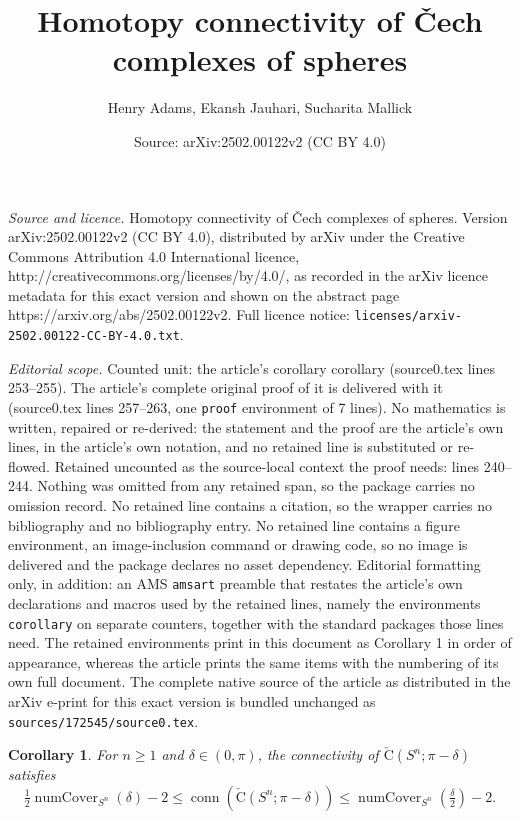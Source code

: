 \documentclass[10pt,a4paper]{amsart}
\title{Homotopy connectivity of \v{C}ech complexes of spheres}
\author{Henry Adams, Ekansh Jauhari, Sucharita Mallick}
\date{Source: arXiv:2502.00122v2 (CC BY 4.0)}
\newtheorem{corollary}{Corollary}
\newcommand{\cech}[2]{\mathrm{\check{C}}(#1;#2)}
\DeclareMathOperator{\conn}{conn}
\DeclareMathOperator{\numcov}{numCover}
\begin{document}
\maketitle

\noindent\emph{Source and licence.} Homotopy connectivity of \v{C}ech complexes of spheres. Version arXiv:2502.00122v2 (CC BY 4.0), distributed by arXiv under the Creative Commons Attribution 4.0 International licence, http://creativecommons.org/licenses/by/4.0/, as recorded in the arXiv licence metadata for this exact version and shown on the abstract page https://arxiv.org/abs/2502.00122v2. Full licence notice: \texttt{licenses/arxiv-2502.00122-CC-BY-4.0.txt}.\par\smallskip

\noindent\textit{Editorial scope.} Counted unit: the article's corollary corollary (source0.tex lines 253--255). The article's complete original proof of it is delivered with it (source0.tex lines 257--263, one \texttt{proof} environment of 7 lines). No mathematics is written, repaired or re-derived: the statement and the proof are the article's own lines, in the article's own notation, and no retained line is substituted or re-flowed.  Retained uncounted as the source-local context the proof needs: lines 240--244.  Nothing was omitted from any retained span, so the package carries no omission record.  No retained line contains a citation, so the wrapper carries no bibliography and no bibliography entry.  No retained line contains a figure environment, an image-inclusion command or drawing code, so no image is delivered and the package declares no asset dependency.  Editorial formatting only, in addition: an AMS \texttt{amsart} preamble that restates the article's own declarations and macros used by the retained lines, namely the environments \texttt{corollary} on separate counters, together with the standard packages those lines need.  The retained environments print in this document as Corollary 1 in order of appearance, whereas the article prints the same items with the numbering of its own full document.  The complete native source of the article as distributed in the arXiv e-print for this exact version is bundled unchanged as \texttt{sources/172545/source0.tex}.
\begin{corollary}
\label{cor:main}
For $n\ge 1$ and $\delta\in(0,\pi)$, the connectivity of $\cech{S^n}{\pi-\delta}$ satisfies
\[\tfrac{1}{2}\numcov_{S^n}(\delta) - 2 \le \conn(\cech{S^n}{\pi-\delta}) \le \numcov_{S^n}\left(\tfrac{\delta}{2}\right)-2.\]
\end{corollary}
\end{document}
